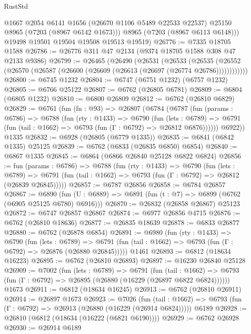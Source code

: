 \begin{lexlean}{RustStd}
\begin{coremodule}
          @1667
          @2054
          @6141
          @1656
          (@26670 @1106 @5489 @22533 @22537)
          @25150
          @8965
          (@7203 (@8967 @6142 @1673)))
        @8965
        (@7203 (@8967 @6113 @6148)))
      @19498
      @19501
      @19504
      @19508
      @19513
      @19519)
@26776 := @7335 @18705 @1588
@26786 := @26776 @311 @47 @2134 (@9374 @18705 @1588 @308 @47 @2133 @9386)
@26799 := @26465
    (@26490
      (@26531
        (@26533
          (@26535 (@26552 (@26570 (@26587 (@26600 (@26609 (@26613 (@26697 (@26774 @26786))))))))))))
@26800 := @6745 @1232
@26804 := @6747 (@6751 @1232) (@6757 @1232)
@26805 := @6766 @25122
@26807 := @6762 (@26805 @6781)
@26809 := @6804 (@6805 @1232)
@26810 := @6800 @26809
@26812 := @6762 (@26810 @6829)
@26829 := @6761
    (fun (fn : @93) =>
    @26807
      (@6784
        (@6787
          (fun (params : @6786) =>
          @6788
            (fun (rty : @1433) =>
            @6790
              (fun (lets : @6789) =>
              @6791 (fun (tail : @1662) => @6793 (fun (Γ : @6792) => @26812 @6876))))))
        @6922))
    @1335
@26832 := @6928 (@26805 (@6779 @1335))
@26835 := @6841 (@6842 @1335) @25125
@26839 := @6762 (@6833 (@26835 @6850) @6854)
@26840 := @6867 @1335
@26845 := @6864 (@6866 @26840 @25128 @6822 @6824)
@26856 := fun (params : @6786) =>
  @6788
    (fun (rty : @1433) =>
    @6790
      (fun (lets : @6789) =>
      @6791 (fun (tail : @1662) => @6793 (fun (Γ : @6792) => @26812 (@26839 @26845)))))
@26857 := @6787 @26856
@26858 := @6784 @26857
@26867 := @6890
    (fun (U : @6889) => @6891 (fun (t : @7) => @6899 (@6762 (@6905 @25125 @6780) @6916)))
@26870 := @26832 (@26858 @26867) @25123
@26872 := @6747 @26857 @26867
@26874 := @6977 @26856 @4715
@26876 := @6762 (@26810 @18636)
@26877 := @26835 @18639
@26878 := @6833 @26877
@26880 := @6762 (@26878 @6854)
@26891 := @6980
    (fun (rty : @1433) =>
    @6790
      (fun (lets : @6789) =>
      @6791 (fun (tail : @1662) => @6793 (fun (Γ : @6792) => @26876 (@26880 @26845)))))
    @1461
@26893 := @6812 (@18634 @16223)
@26895 := @6762 (@26810 @26893)
@26897 := @16230 @26840 @25128
@26909 := @7002
    (fun (lets : @6789) =>
    @6791
      (fun (tail : @1662) =>
      @6793 (fun (Γ : @6792) => @26895 (@26880 (@16229 (@26897 @6822 @6824))))))
    @1673
@26911 := @6812 (@18634 @16245)
@26913 := @6762 (@26810 @26911)
@26914 := @26897 @1673
@26923 := @7026
    (fun (tail : @1662) => @6793 (fun (Γ : @6792) => @26913 (@26880 (@16229 (@26914 @6824)))))
    @6189
@26928 := @26810 (@6812 (@18634 (@16222 (@6821 @6190))))
@26929 := @6762 @26928
@26930 := @26914 @6189

\end{coremodule}
\end{lexlean}
